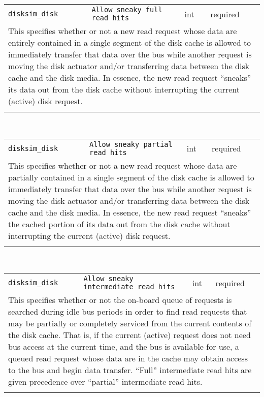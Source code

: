 \noindent 
\begin{tabular}{|p{\lpmodwidth}|p{\lpnamewidth}|p{0.5in}|p{0.5in}|}
\cline{1-4}
\texttt{disksim\_disk} & \texttt{Allow sneaky full read hits} & int & required \\ 
\cline{1-4}
\multicolumn{4}{|p{6in}|}{
This specifies whether or not a new read request whose data are entirely
contained in a single segment of the disk cache is allowed to
immediately transfer that data over the bus while another request is
moving the disk actuator and/or transferring data between the disk
cache and the disk media. In essence, the new read request ``sneaks''
its data out from the disk cache without interrupting the current
(active) disk request.
}\\ 
\cline{1-4}
\multicolumn{4}{p{5in}}{}\\
\end{tabular}\\ 
\noindent 
\begin{tabular}{|p{\lpmodwidth}|p{\lpnamewidth}|p{0.5in}|p{0.5in}|}
\cline{1-4}
\texttt{disksim\_disk} & \texttt{Allow sneaky partial read hits} & int & required \\ 
\cline{1-4}
\multicolumn{4}{|p{6in}|}{
This specifies whether or not a new read request whose data are partially
contained in a single segment of the disk cache is allowed to
immediately transfer that data over the bus while another request is
moving the disk actuator and/or transferring data between the disk
cache and the disk media. In essence, the new read request ``sneaks''
the cached portion of its data out from the disk cache without
interrupting the current (active) disk request.
}\\ 
\cline{1-4}
\multicolumn{4}{p{5in}}{}\\
\end{tabular}\\ 
\noindent 
\begin{tabular}{|p{\lpmodwidth}|p{\lpnamewidth}|p{0.5in}|p{0.5in}|}
\cline{1-4}
\texttt{disksim\_disk} & \texttt{Allow sneaky intermediate read hits} & int & required \\ 
\cline{1-4}
\multicolumn{4}{|p{6in}|}{
This specifies whether or not the on-board queue of requests is searched
during idle bus periods in order to find read requests that may be
partially or completely serviced from the current contents of the disk
cache. That is, if the current (active) request does not need bus
access at the current time, and the bus is available for use, a queued
read request whose data are in the cache may obtain access to the bus
and begin data transfer. ``Full'' intermediate read hits are given
precedence over ``partial'' intermediate read hits.
}\\ 
\cline{1-4}
\multicolumn{4}{p{5in}}{}\\
\end{tabular}\\ 
